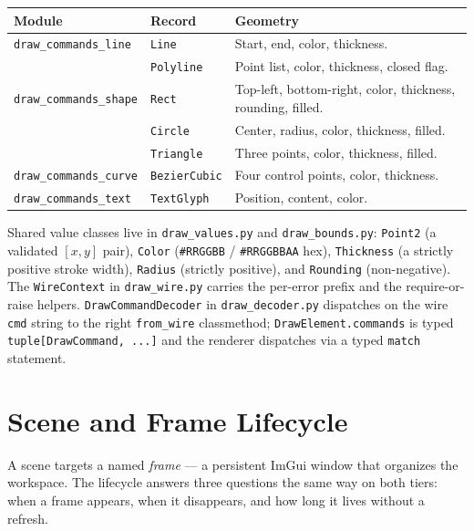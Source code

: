 \documentclass[a4paper,10pt]{article}
\begin{document}
\begin{center}
\begin{tabular}{llp{6cm}}
\toprule
\textbf{Module} & \textbf{Record} & \textbf{Geometry} \\
\midrule
\texttt{draw\_commands\_line}   & \texttt{Line}        & Start, end, color, thickness. \\
                                & \texttt{Polyline}    & Point list, color, thickness, closed flag. \\
\midrule
\texttt{draw\_commands\_shape}  & \texttt{Rect}        & Top-left, bottom-right, color, thickness, rounding, filled. \\
                                & \texttt{Circle}      & Center, radius, color, thickness, filled. \\
                                & \texttt{Triangle}    & Three points, color, thickness, filled. \\
\midrule
\texttt{draw\_commands\_curve}  & \texttt{BezierCubic} & Four control points, color, thickness. \\
\midrule
\texttt{draw\_commands\_text}   & \texttt{TextGlyph}   & Position, content, color. \\
\bottomrule
\end{tabular}
\end{center}

Shared value classes live in \texttt{draw\_values.py} and
\texttt{draw\_bounds.py}: \texttt{Point2} (a validated $[x, y]$ pair),
\texttt{Color} (\texttt{\#RRGGBB} / \texttt{\#RRGGBBAA} hex),
\texttt{Thickness} (a strictly positive stroke width), \texttt{Radius}
(strictly positive), and \texttt{Rounding} (non-negative).  The
\texttt{WireContext} in \texttt{draw\_wire.py} carries the per-error prefix
and the require-or-raise helpers.  \texttt{DrawCommandDecoder} in
\texttt{draw\_decoder.py} dispatches on the wire \texttt{cmd} string to the
right \texttt{from\_wire} classmethod; \texttt{DrawElement.commands} is
typed \texttt{tuple[DrawCommand, ...]} and the renderer dispatches via a
typed \texttt{match} statement.

\section{Scene and Frame Lifecycle}\label{sec:frames}

A scene targets a named \emph{frame} --- a persistent ImGui window that
organizes the workspace.  The lifecycle answers three questions the same
way on both tiers: when a frame appears, when it disappears, and how long
it lives without a refresh.
\end{document}
